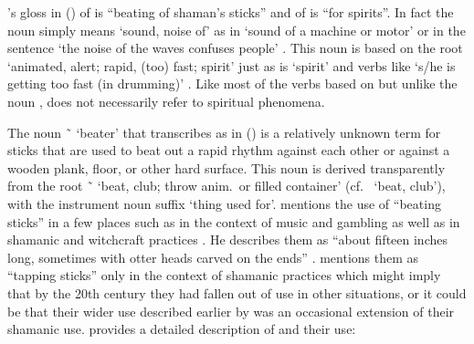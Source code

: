 \citeauthor{swanton:1909}’s gloss in (\lastx) of  is “beating of shaman’s sticks” and of  is “for spirits”.
In fact the noun  simply means ‘sound, noise of’ as in  ‘sound of a machine or motor’ or in the sentence  ‘the noise of the waves confuses people’ \parencite[54.602]{story-naish:1973}.
This noun is based on the root  ‘animated, alert; rapid, (too) fast; spirit’ just as is  ‘spirit’ and verbs like  ‘s/he is getting too fast (in drumming)’ \parencite[27.160]{story-naish:1973}.
Like most of the verbs based on  but unlike the noun ,  does not necessarily refer to spiritual phenomena.

The noun  \~\  ‘beater’ that \citeauthor{swanton:1909} transcribes as  in (\lastx) is a relatively unknown term for sticks that are used to beat out a rapid rhythm against each other or against a wooden plank, floor, or other hard surface.
This noun is derived transparently from the root  \~\  ‘beat, club; throw anim.\ or filled container’ (cf.\  ‘beat, club’), with the instrument noun suffix  ‘thing used for’.
\citeauthor{emmons:1991} mentions the use of “beating sticks” in a few places such as in the context of music \parencite[292]{emmons:1991} and gambling \parencite[419]{emmons:1991} as well as in shamanic and witchcraft practices \parencite[376, 383ff, 407ff]{emmons:1991}.
He describes them as “about fifteen inches long, sometimes with otter heads carved on the ends” \parencite[381]{emmons:1991}.
\citeauthor{de-laguna:1972} mentions them as “tapping sticks” only in the context of shamanic practices \parencite[697]{de-laguna:1972} which might imply that by the 20th century they had fallen out of use in other situations, or it could be that their wider use described earlier by \citeauthor{emmons:1991} was an occasional extension of their shamanic use.
\citeauthor{de-laguna:1972} provides a detailed description of  and their use:

